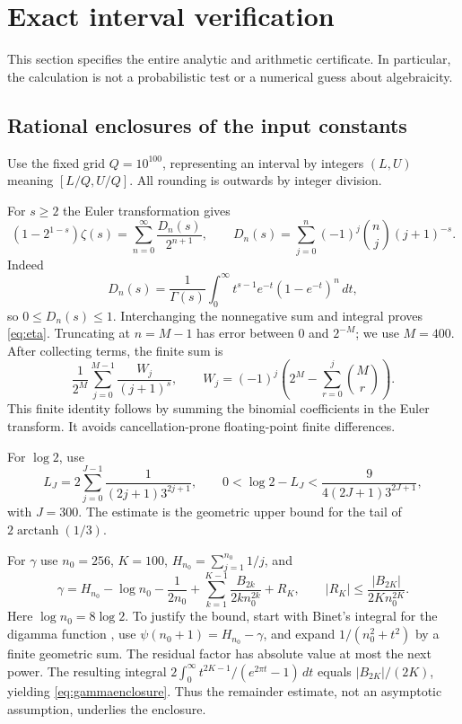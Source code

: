 \documentclass[11pt,a4paper]{article}
\theoremstyle{definition}\newtheorem{definition}[theorem]{Definition}
\theoremstyle{remark}\newtheorem{remark}[theorem]{Remark}
\begin{document}
\section{Exact interval verification}\label{sec:computation}
This section specifies the entire analytic and arithmetic certificate. In particular, the calculation is not a probabilistic test or a numerical guess about algebraicity.

\subsection{Rational enclosures of the input constants}
Use the fixed grid $Q=10^{100}$, representing an interval by integers $(L,U)$ meaning $[L/Q,U/Q]$. All rounding is outwards by integer division.

For $s\ge2$ the Euler transformation gives
\begin{equation}\label{eq:eta}
(1-2^{1-s})\zeta(s)=\sum_{n=0}^{\infty}\frac{D_n(s)}{2^{n+1}},\qquad
D_n(s)=\sum_{j=0}^n(-1)^j\binom nj(j+1)^{-s}.
\end{equation}
Indeed
\[
D_n(s)=\frac1{\Gamma(s)}\int_0^\infty t^{s-1}e^{-t}(1-e^{-t})^n\,dt,
\]
so $0\le D_n(s)\le1$. Interchanging the nonnegative sum and integral proves \eqref{eq:eta}. Truncating at $n=M-1$ has error between $0$ and $2^{-M}$; we use $M=400$. After collecting terms, the finite sum is
\begin{equation}\label{eq:weights}
\frac1{2^M}\sum_{j=0}^{M-1}\frac{W_j}{(j+1)^s},\qquad
W_j=(-1)^j\left(2^M-\sum_{r=0}^j\binom Mr\right).
\end{equation}
This finite identity follows by summing the binomial coefficients in the Euler transform. It avoids cancellation-prone floating-point finite differences.

For $\log2$, use
\begin{equation}\label{eq:log2}
L_J=2\sum_{j=0}^{J-1}\frac{1}{(2j+1)3^{2j+1}},\qquad
0<\log2-L_J<\frac{9}{4(2J+1)3^{2J+1}},
\end{equation}
with $J=300$. The estimate is the geometric upper bound for the tail of $2\operatorname{arctanh}(1/3)$.

For $\gamma$ use $n_0=256$, $K=100$, $H_{n_0}=\sum_{j=1}^{n_0}1/j$, and
\begin{equation}\label{eq:gammaenclosure}
\gamma=H_{n_0}-\log n_0-\frac1{2n_0}
+\sum_{k=1}^{K-1}\frac{B_{2k}}{2k n_0^{2k}}+R_K,
\qquad |R_K|\le\frac{|B_{2K}|}{2K n_0^{2K}}.
\end{equation}
Here $\log n_0=8\log2$. To justify the bound, start with Binet's integral for the digamma function \cite[Eq.~5.9.15]{DLMF}, use $\psi(n_0+1)=H_{n_0}-\gamma$, and expand $1/(n_0^2+t^2)$ by a finite geometric sum. The residual factor has absolute value at most the next power. The resulting integral
$2\int_0^\infty t^{2K-1}/(e^{2\pi t}-1)\,dt$ equals $|B_{2K}|/(2K)$, yielding \eqref{eq:gammaenclosure}. Thus the remainder estimate, not an asymptotic assumption, underlies the enclosure.
\end{document}
